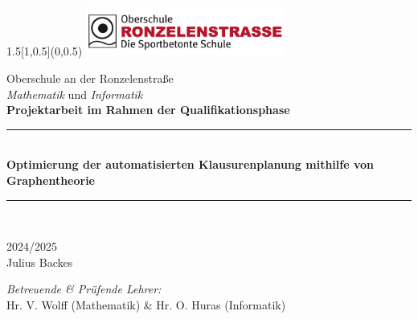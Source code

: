 \begin{titlepage}
\BgThispage
\begin{textblock}{1.5}[1,0.5](0,0.5)
	\includegraphics[width=6.5cm]{logos/logoronzelen.png}\\[3.5cm]
  \end{textblock}
  

  
\bigskip
\bigskip
\begin{center}
{ \large{Oberschule an der Ronzelenstraße\\[0.2cm]
\textit{Mathematik} und \textit{Informatik}}}\\[1cm]

{\large \textbf{Projektarbeit im Rahmen der Qualifikationsphase}}\\[0.6cm]

\rule{\linewidth}{0.5mm} \\[0.1cm]
{ \huge \bfseries Optimierung der automatisierten Klausurenplanung mithilfe von Graphentheorie
 \\[0.1cm] }
\rule{\linewidth}{0.5mm} \\[1.5cm]

\noindent

{\large  
    2024/2025
  } \\[1cm] 

{\Large  
    Julius Backes
  } \\

\begin{center}
    
\end{center}

{\textit{Betreuende \& Prüfende Lehrer:}}\\[0.3cm]
 {Hr. V. Wolff (Mathematik) \& Hr. O. Huras (Informatik)}




\end{center}


\end{titlepage}